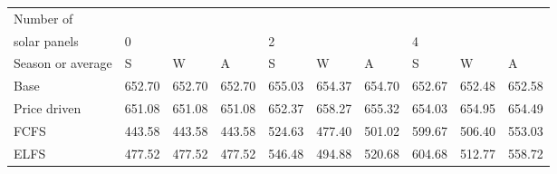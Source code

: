 \begin{table}[h] 
\centering 
\begin{tabular}{l|lll|lll|lll}Number of \\ solar panels&0& & &2& & &4& & \\ \hline 
Season or average & S & W & A & S & W & A & S & W & A \\ \hline 
Base&652.70&652.70&652.70&655.03&654.37&654.70&652.67&652.48&652.58 \\ 
Price driven&651.08&651.08&651.08&652.37&658.27&655.32&654.03&654.95&654.49 \\ 
FCFS&443.58&443.58&443.58&524.63&477.40&501.02&599.67&506.40&553.03 \\ 
ELFS&477.52&477.52&477.52&546.48&494.88&520.68&604.68&512.77&558.72 \\ 
\end{tabular} 
\end{table}